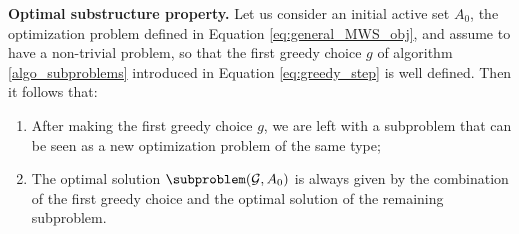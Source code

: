 \begin{theorem}\label{theo:optm_sub_prop}
\textbf{Optimal substructure property.}
Let us consider an initial active set $A_0$, the optimization problem defined in Equation \ref{eq:general_MWS_obj}, and assume to have a non-trivial problem, so that the first greedy choice $g$ of algorithm \ref{algo_subproblems} introduced in Equation \ref{eq:greedy_step} is well defined. Then it follows that:
\begin{enumerate}
\item After making the first greedy choice $g$, we are left with a subproblem that can be seen as a new optimization problem of the same type;
\item The optimal solution $\subproblem(\mathcal{G},A_0)$ is always given by the combination of the first greedy choice and the optimal solution of the remaining subproblem.
\end{enumerate}
 
\end{theorem}

